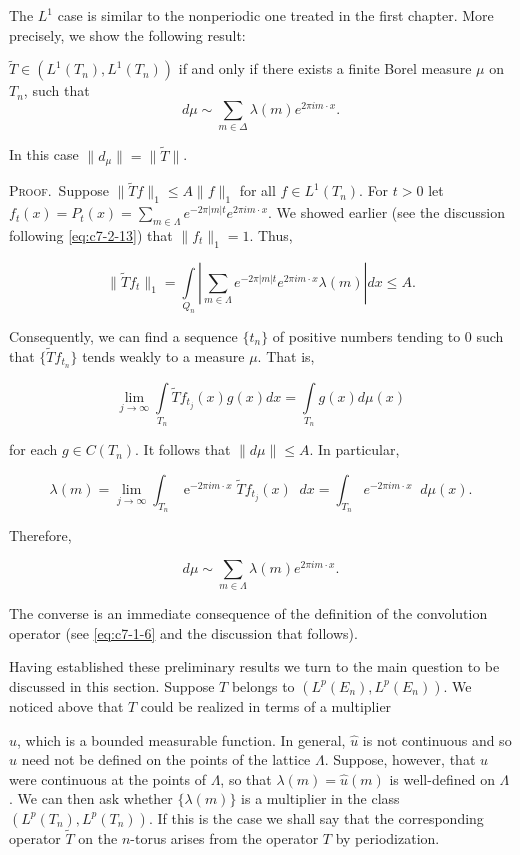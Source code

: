 The $L^{1}$ case is similar to the nonperiodic one treated in the first chapter. More precisely, we show the following result:

\begin{theorem}
\label{thm:c7-3-4}
$\tilde{T} \in (L^1(T_n), L^1(T_n))$ if and only if there exists a finite Borel measure $\mu$ on $T_n$, such that
\begin{equation}\label{eq:c7-3-5}
d\mu\sim\sum_{m\in\Delta}\lambda(m)e^{2\pi i m\cdot x}.
\end{equation}

\end{theorem}

In this case $\|d_\mu\| = \|\tilde{T}\|$.

\textsc{Proof.}\ Suppose $\|\tilde{T}f\|_1 \leq A \|f\|_1$ for all $f \in L^1(T_n)$. For $t > 0$ let $f_t(x) = P_t(x) = \sum_{m \in \Lambda} e^{-2\pi |m| t} e^{2\pi i m \cdot x}$. We showed earlier (see the discussion following \eqref{eq:c7-2-13}) that $\|f_t\|_1 = 1$. Thus,

\[
\|\tilde{T}f_{t}\|_{1}=\int\limits_{Q_{n}}\left|\sum_{m\in\Lambda}e^{-2\pi|m|t}e^{2\pi i m\cdot x}\lambda(m)\right|d x\leq A.
\]

Consequently, we can find a sequence $\{t_n\}$ of positive numbers tending to 0 such that $\{\tilde{T}f_{t_n}\}$ tends weakly to a measure $\mu$. That is,

\[
\lim_{j\to\infty}\int\limits_{T_{n}}\tilde{T}f_{t_{j}}(x)g(x)d x=\int\limits_{T_{n}}g(x)d\mu(x)
\]

for each $g \in C(T_n)$. It follows that $\|d\mu\| \leq A$. In particular,

\[
\lambda(m)=\lim_{j\to\infty}\int_{T_{n}}\mathopen{e}^{-2\pi i m\cdot x}\widetilde{T}f_{t_{j}}(x)\mathop{}{d}x=\int_{T_{n}}\mathopen{}{e}^{-2\pi i m\cdot x}\mathop{}{d}\mu(x).
\]

Therefore,

\[
d\mu\sim\sum_{m\in\Lambda}\lambda(m)e^{2\pi i m\cdot x}.
\]

The converse is an immediate consequence of the definition of the convolution operator (see \eqref{eq:c7-1-6} and the discussion that follows).

Having established these preliminary results we turn to the main question to be discussed in this section. Suppose $T$ belongs to $(L^p(E_n), L^p(E_n))$. We noticed above that $T$ could be realized in terms of a multiplier

$\hat{u}$, which is a bounded measurable function. In general, $\hat{u}$ is not continuous and so $\hat{u}$ need not be defined on the points of the lattice $\Lambda$. Suppose, however, that $\hat{u}$ were continuous at the points of $\Lambda$, so that $\lambda(m) = \hat{u}(m)$ is well-defined on $\Lambda$. We can then ask whether $\{\lambda(m)\}$ is a multiplier in the class $(L^p(T_n), L^p(T_n))$. If this is the case we shall say that the corresponding operator $\tilde{T}$ on the $n$-torus arises from the operator $T$ by periodization.

